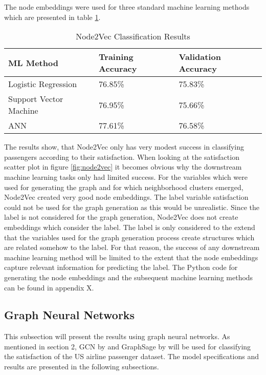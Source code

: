   \noindent The node embeddings were used for three standard machine learning
  methods which are presented in table \ref{table:node2vec_results}.

  \begin{table}[h]
    \centering
    \begin{tabular}{|l||l|l|}
      \hline
      \textbf{ML Method} & \textbf{Training Accuracy} & \textbf{Validation
      Accuracy}\\
      \hline\hline
      Logistic Regression & 76.85\% & 75.83\% \\\hline 
      Support Vector Machine & 76.95\% & 75.66\% \\\hline
      ANN & 77.61\% & 76.58\% \\
      \hline
    \end{tabular}
    \caption{Node2Vec Classification Results}
    \label{table:node2vec_results}
  \end{table}

  \noindent The results show, that Node2Vec only has very modest success in
  classifying passengers according to their satisfaction. When looking at the
  satisfaction scatter plot in figure \ref{fig:node2vec} it becomes obvious why
  the downstream machine learning tasks only had limited success. For the
  variables which were used for generating the graph and for which neighborhood
  clusters emerged, Node2Vec created very good node embeddings. The label
  variable satisfaction could not be used for the graph generation as this would
  be unrealistic. Since the label is not considered for the graph generation,
  Node2Vec does not create embeddings which consider the label. The label is
  only considered to the extend that the variables used for the graph
  generation process create structures which are related somehow to the label.
  For that reason, the success of any downstream machine learning method will
  be limited to the extent that the node embeddings capture relevant information
  for predicting the label. The Python code for generating the node embeddings 
  and the subsequent machine learning methods can be found in appendix X. 

  \subsection{Graph Neural Networks}

  This subsection will present the results using graph neural networks. As
  mentioned in section 2, GCN by \cite{kipf2016semi} and
  GraphSage by \cite{hamilton2017inductive} will be used for classifying the
  satisfaction of the US airline passenger dataset. The model specifications 
  and results are presented in the following subsections.

